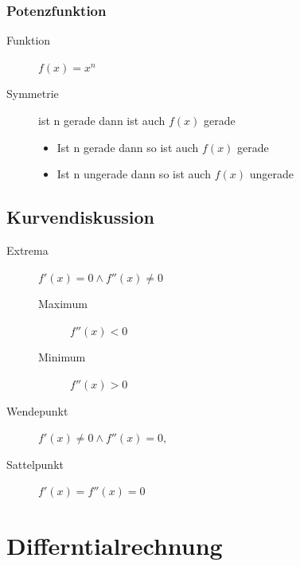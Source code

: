 \documentclass[a4paper]{scrartcl}
\begin{document}
        
        \subsubsection{Potenzfunktion}
           \begin{description}
               \item[Funktion] $f(x) = x^n$ 
               \item[Symmetrie] ist n gerade dann ist auch $f(x)$ gerade
               \begin{itemize}
                   \item Ist n gerade dann so ist auch $f(x)$ gerade
                   \item Ist n ungerade dann so ist auch $f(x)$ ungerade
               \end{itemize} 
           \end{description}       
    

           \subsection{Kurvendiskussion}
                \begin{description}
                    \item[Extrema] \(f'(x) = 0 \wedge f''(x) \neq 0\)
                    \begin{description}
                        \item[Maximum] \(f''(x) < 0\)
                        \item[Minimum]  \(f''(x) > 0\)
                    \end{description}
                    \item[Wendepunkt] \( f'(x) \neq 0 \wedge f''(x) = 0, \)
                    \item[Sattelpunkt] \(f'(x) = f''(x) = 0\) 
                \end{description}



    \section{Differntialrechnung}
\end{document}
